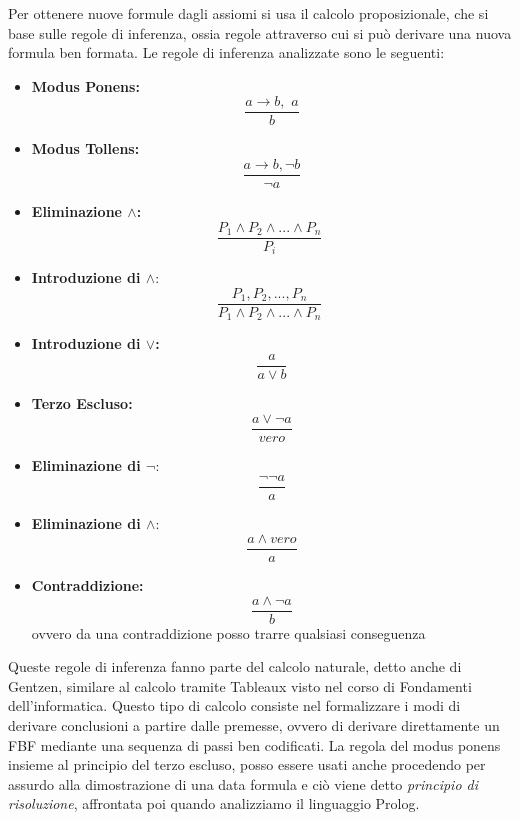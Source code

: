 Per ottenere nuove formule dagli assiomi si usa il calcolo proposizionale, che si base sulle regole di inferenza, ossia regole attraverso
cui si può derivare una nuova formula ben formata.\newline
Le regole di inferenza analizzate sono le seguenti:
\begin{itemize}
\item \textbf{Modus Ponens:}
  \begin{equation*}
    \frac{a\to b,\,\,a}{b}
  \end{equation*}
\item \textbf{Modus Tollens:}
  \begin{equation*}
    \frac{a\to b, \neg b}{\neg a}
  \end{equation*}
\item \textbf{Eliminazione $\land$:}
  \begin{equation*}
    \frac{P_1\land P_2 \land ... \land P_n}{P_i}\,\,
  \end{equation*}
\item \textbf{Introduzione di $\land$}:
  \begin{equation*}
    \frac{P_1, P_2,...,P_n}{P_1\land P_2 \land ... \land P_n}\,\,
  \end{equation*}
\item \textbf{Introduzione di $\lor$:}
  \begin{equation*}
    \frac{a}{a \lor b}
  \end{equation*}
\item \textbf{Terzo Escluso:}
  \begin{equation*}
    \frac{a \lor \neg a}{vero}
  \end{equation*}

\item \textbf{Eliminazione di $\neg$}:
  \begin{equation*}
    \frac{\neg \neg a}{a}
  \end{equation*}

\item \textbf{Eliminazione di $\land$}:
  \begin{equation*}
    \frac{a \land vero}{a}
  \end{equation*}
\item \textbf{Contraddizione:}
  \begin{equation*}
    \frac{a \land \neg a}{b}
  \end{equation*}
ovvero da una contraddizione posso trarre qualsiasi conseguenza
\end{itemize}
Queste regole di inferenza fanno parte del calcolo naturale, detto anche di Gentzen, similare al calcolo tramite Tableaux visto nel corso
di Fondamenti dell'informatica.\newline
Questo tipo di calcolo consiste nel formalizzare i modi di derivare conclusioni a partire dalle premesse, ovvero di derivare direttamente un FBF
mediante una sequenza di passi ben codificati.\newline
La regola del modus ponens  insieme al principio del terzo escluso, posso essere usati anche procedendo per assurdo alla dimostrazione
di una data formula e ciò viene detto \emph{principio di risoluzione}, affrontata poi quando analizziamo il linguaggio Prolog.


